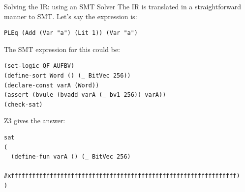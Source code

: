 \documentclass[aspectratio=169]{beamer}
\begin{document}
%

%
%
%

\begin{frame}[fragile=singleslide]{Solving the IR: using an SMT Solver}
The IR is translated in a straightforward manner to SMT. Let's say the expression is:

\begin{Verbatim}[frame=single, framerule=0.2mm, framesep=2mm,fontsize=\footnotesize]
PLEq (Add (Var "a") (Lit 1)) (Var "a")
\end{Verbatim}

The SMT expression for this could be:

\begin{Verbatim}[frame=single, framerule=0.2mm, framesep=2mm,fontsize=\footnotesize]
(set-logic QF_AUFBV)
(define-sort Word () (_ BitVec 256))
(declare-const varA (Word))
(assert (bvule (bvadd varA (_ bv1 256)) varA))
(check-sat)
\end{Verbatim}

Z3 gives the answer:

\begin{Verbatim}[frame=single, framerule=0.2mm, framesep=2mm,fontsize=\footnotesize]
sat
(
  (define-fun varA () (_ BitVec 256)
    #xffffffffffffffffffffffffffffffffffffffffffffffffffffffffffffffff)
)
\end{Verbatim}
\end{frame}
\end{document}
